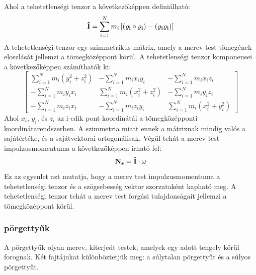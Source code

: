 \documentclass[../main.tex]{subfiles}
\begin{document}
Ahol a tehetetlenségi tenzor a következőképpen definiálható:
\begin{equation}
    \bold{\hat{I}} = \sum_{i=1}^{N} m_i \left[(\bold{\varrho_i} \circ \bold{\varrho_i}) - (\bold{\varrho_i} \bold{\varrho_i})\right]
\end{equation}
A tehetetlenségi tenzor egy szimmetrikus mátrix, amely a merev test tömegének eloszlását jellemzi a tömegközéppont körül. A tehetetlenségi tenzor komponensei a következőképpen számíthatók ki:
\begin{equation}
\begin{bmatrix}
\sum_{i=1}^{N} m_i (y_i^2 + z_i^2) & -\sum_{i=1}^{N} m_i x_i y_i & -\sum_{i=1}^{N} m_i x_i z_i \\
-\sum_{i=1}^{N} m_i y_i x_i & \sum_{i=1}^{N} m_i (x_i^2 + z_i^2) & -\sum_{i=1}^{N} m_i y_i z_i \\
-\sum_{i=1}^{N} m_i z_i x_i & -\sum_{i=1}^{N} m_i z_i y_i & \sum_{i=1}^{N} m_i (x_i^2 + y_i^2)
\end{bmatrix}
\end{equation}
Ahol $x_i$, $y_i$, és $z_i$ az i-edik pont koordinátái a tömegközépponti koordinátarendszerben. A szimmetria miatt ennek a mátrixnak mindig valós a sajátértéke, és a sajátvektorai ortogonálisak.
Végül tehát a merev test impulzusmomentuma a következőképpen írható fel:
\begin{equation}
    \bold{N_s} = \bold{\hat{I}} \cdot \bold{\omega}
\end{equation}
Ez az egyenlet azt mutatja, hogy a merev test impulzusmomentuma a tehetetlenségi tenzor és a szögsebesség vektor szorzataként kapható meg. A tehetetlenségi tenzor tehát a merev test forgási tulajdonságait jellemzi a tömegközéppont körül.

\subsubsection{pörgettyűk}
A pörgettyűk olyan merev, kiterjedt testek, amelyek egy adott tengely körül forognak. Két fajtájukat különböztetjük meg: a súlytalan pörgettyűt és a súlyos pörgettyűt.
\end{document}
